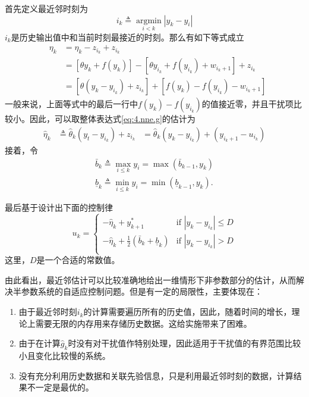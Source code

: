 首先定义最近邻时刻为
\begin{equation}\label{eq:4.it}
i_k\triangleq\mathop{\arg \min}\limits_{i<k}|y_k-y_i|
\end{equation}
$i_k$是历史输出值中和当前时刻最接近的时刻。那么有如下等式成立
\begin{equation*}
\begin{array}{lll}
&\eta_k&=\eta_k-z_{i_k}+z_{i_k}\\
&&=[\theta y_k+f(y_k)]-[\theta y_{i_k}+f(y_{i_k})+w_{i_k+1}]+z_{i_k}\\
&&=[\theta(y_k-y_{i_k})+z_{i_k}]+[f(y_k)-f(y_{i_k})-w_{i_k+1}]
\end{array}
\end{equation*}
一般来说，上面等式中的最后一行中$f(y_k)-f(y_{i_k})$的值接近零，并且干扰项比较小。因此，可以取整体表达式\eqref{eq:4.nne.g}的估计为
\begin{equation}\label{eq.4:g.est}
\begin{array}{lll}
\hat{\eta}_k&\triangleq\hat{\theta}_k(y_t-y_{i_k})+z_{i_k}
&=\hat{\theta}_{k}(y_k-y_{i_k})+(y_{i_k+1}-u_{i_k})
\end{array}
\end{equation}
接着，令
\begin{equation}\label{eq.4:bk}
\begin{array}{lll}
\bar{b}_k\triangleq \max\limits_{i\leq k}y_i
         =\max(\bar{b}_{k-1}, y_k)\\
\underline{b}_k\triangleq \min\limits_{i\leq k}{y_i}
                =\min(\underline{b}_{k-1}, y_k).
\end{array} 
\end{equation}

最后基于设计出下面的控制律
\begin{equation}\label{eq:4.uk}
u_{k}=\left\{
\begin{array}{cc}
  -\hat \eta_k+y_{k+1}^* & \text{if } |y_k-y_{i_k}|\le D \\
  -\hat \eta_k+\frac12(\bar b_k+\underline b_k) & \text{if } |y_k-y_{i_k}|> D \\
\end{array}
\right.
\end{equation}
这里，$D$是一个合适的常数值。

由此看出，最近邻估计可以比较准确地给出一维情形下非参数部分的估计，从而解决半参数系统的自适应控制问题。但是有一定的局限性，主要体现在：
\begin{enumerate}
\item 由于最近邻时刻$i_k$的计算需要遍历所有的历史值，因此，随着时间的增长，理论上需要无限的内存用来存储历史数据。这给实施带来了困难。
\item 由于在计算$\hat{g}_k$时没有对干扰值作特别处理，因此适用于干扰值的有界范围比较小且变化比较慢的系统。
\item 没有充分利用历史数据和关联先验信息，只是利用最近邻时刻的数据，计算结果不一定是最优的。
\end{enumerate}

